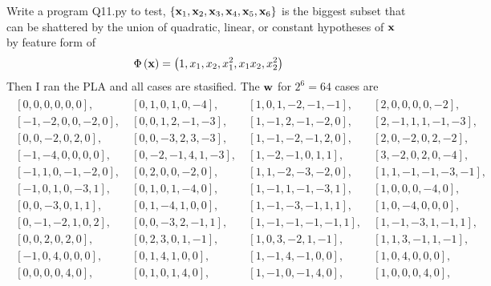 \documentclass[12pt]{article}
\newcommand{\CBrackets}[1]{\left\{#1\right\}}
\newcommand{\ParTh}[1]{\left(#1\right)}
\newcommand{\BF}[1]{{\bf#1}}
\begin{document}
Write a program Q11.py to test, $\CBrackets{\BF{x}_1,\BF{x}_2,\BF{x}_3,\BF{x}_4,\BF{x}_5,\BF{x}_6}$ is the biggest subset that can be shattered by the union of quadratic, linear, or constant hypotheses of $\BF{x}$ by feature form of
\begin{align}
\Phi\ParTh{\BF{x}}=\ParTh{1,x_1,x_2,x^2_1,x_1x_2,x^2_2}
\end{align}
Then I ran the PLA and all cases are stasified. The $\BF{w}$ for $2^6=64$ cases are
\begin{align}
\begin{array}{llll}
\left[ 0,  0,  0,  0,  0,  0\right],~&\left[ 0,  1,  0,  1,  0, -4\right],~&\left[ 1,  0,  1, -2, -1, -1\right],~&\left[ 2,  0,  0,  0,  0, -2\right],\\
\left[-1, -2,  0,  0, -2,  0\right],~&\left[ 0,  0,  1,  2, -1, -3\right],~&\left[ 1, -1,  2, -1, -2,  0\right],~&\left[ 2, -1,  1,  1, -1, -3\right],\\
\left[ 0,  0, -2,  0,  2,  0\right],~&\left[ 0,  0, -3,  2,  3, -3\right],~&\left[ 1, -1, -2, -1,  2,  0\right],~&\left[ 2,  0, -2,  0,  2, -2\right],\\
\left[-1, -4,  0,  0,  0,  0\right],~&\left[ 0, -2, -1,  4,  1, -3\right],~&\left[ 1, -2, -1,  0,  1,  1\right],~&\left[ 3, -2,  0,  2,  0, -4\right],\\
\left[-1,  1,  0, -1, -2,  0\right],~&\left[ 0,  2,  0,  0, -2,  0\right],~&\left[ 1,  1, -2, -3, -2,  0\right],~&\left[ 1,  1, -1, -1, -3, -1\right],\\
\left[-1,  0,  1,  0, -3,  1\right],~&\left[ 0,  1,  0,  1, -4,  0\right],~&\left[ 1, -1,  1, -1, -3,  1\right],~&\left[ 1,  0,  0,  0, -4,  0\right],\\
\left[ 0,  0, -3,  0,  1,  1\right],~&\left[ 0,  1, -4,  1,  0,  0\right],~&\left[ 1, -1, -3, -1,  1,  1\right],~&\left[ 1,  0, -4,  0,  0,  0\right],\\
\left[ 0, -1, -2,  1,  0,  2\right],~&\left[ 0,  0, -3,  2, -1,  1\right],~&\left[ 1, -1, -1, -1, -1,  1\right],~&\left[ 1, -1, -3,  1, -1,  1\right],\\
\left[ 0,  0,  2,  0,  2,  0\right],~&\left[ 0,  2,  3,  0,  1, -1\right],~&\left[ 1,  0,  3, -2,  1, -1\right],~&\left[ 1,  1,  3, -1,  1, -1\right],\\
\left[-1,  0,  4,  0,  0,  0\right],~&\left[ 0,  1,  4,  1,  0,  0\right],~&\left[ 1, -1,  4, -1,  0,  0\right],~&\left[ 1,  0,  4,  0,  0,  0\right],\\
\left[ 0,  0,  0,  0,  4,  0\right],~&\left[ 0,  1,  0,  1,  4,  0\right],~&\left[ 1, -1,  0, -1,  4,  0\right],~&\left[ 1,  0,  0,  0,  4,  0\right],\\

\end{array}
\end{align}
\end{document}
